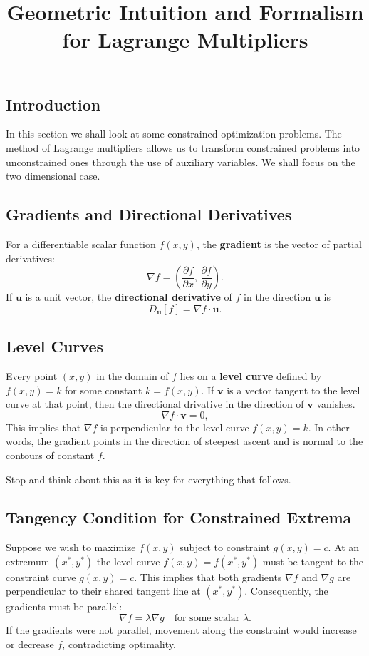 \documentclass{article}
\begin{document}
\title{Geometric Intuition and Formalism for Lagrange Multipliers}
\author{}
\date{}
\maketitle

\subsection*{Introduction}
In this section we shall look at some constrained optimization problems. The  method of Lagrange multipliers allows us to transform constrained problems into unconstrained ones through the use of auxiliary variables. We shall focus on the two dimensional case.

\subsection*{Gradients and Directional Derivatives}

For a differentiable scalar function \( f(x,y) \), the \textbf{gradient} is the vector of partial derivatives:
\[
\nabla f = \left( \frac{\partial f}{\partial x},\, \frac{\partial f}{\partial y} \right).
\]
If \( \mathbf{u} \) is a unit vector, the \textbf{directional derivative} of \( f \) in the direction \( \mathbf{u} \) is
\[
D_{\mathbf{u}} [f]  = \nabla f \cdot \mathbf{u}.
\]

\subsection*{Level Curves}

Every point \((x,y)\) in the domain of \( f \) lies on a \textbf{level curve} defined by \( f(x,y) = k \) for some constant \( k = f(x,y) \).
If \( \mathbf{v} \) is a vector tangent to the level curve at that point, then the directional drivative in the direction of \( \mathbf{v} \) vanishes.
\[
\nabla f \cdot \mathbf{v} = 0,
\]
This implies that \( \nabla f \) is perpendicular to the level curve \( f(x,y) = k \). In other words, the gradient points in the direction of steepest ascent and is normal to the contours of constant \( f \).

Stop and think about this as it is key for everything that follows.

\subsection*{Tangency Condition for Constrained Extrema}
Suppose we wish to maximize $f(x,y)$ subject to constraint $g(x,y) = c$. At an extremum $(x^*, y^*)$ the level curve $f(x,y) = f(x^*,y^*)$ must be tangent to the constraint curve $g(x,y) = c$. This implies that both gradients $\nabla f$ and $\nabla g$ are perpendicular to their shared tangent line at $(x^*, y^*)$. Consequently, the gradients must be parallel:
    \[
    \nabla f = \lambda \nabla g \quad \text{for some scalar } \lambda.
    \]
If the gradients were not parallel, movement along the constraint would increase or decrease $f$, contradicting optimality.
\end{document}
